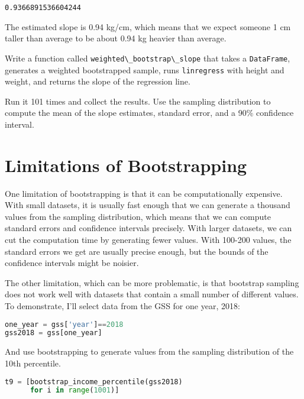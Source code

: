 \begin{lstlisting}[style=output]
0.9366891536604244
\end{lstlisting}

The estimated slope is 0.94 kg/cm, which means that we expect someone 1
cm taller than average to be about 0.94 kg heavier than average.

Write a function called
\passthrough{\lstinline!weighted\_bootstrap\_slope!} that takes a
\passthrough{\lstinline!DataFrame!}, generates a weighted bootstrapped
sample, runs \passthrough{\lstinline!linregress!} with height and
weight, and returns the slope of the regression line.

Run it 101 times and collect the results. Use the sampling distribution
to compute the mean of the slope estimates, standard error, and a 90\%
confidence interval.

\section{Limitations of
Bootstrapping}\label{limitations-of-bootstrapping}

One limitation of bootstrapping is that it can be computationally
expensive. With small datasets, it is usually fast enough that we can
generate a thousand values from the sampling distribution, which means
that we can compute standard errors and confidence intervals precisely.
With larger datasets, we can cut the computation time by generating
fewer values. With 100-200 values, the standard errors we get are
usually precise enough, but the bounds of the confidence intervals might
be noisier.

The other limitation, which can be more problematic, is that bootstrap
sampling does not work well with datasets that contain a small number of
different values. To demonstrate, I'll select data from the GSS for one
year, 2018:

\begin{lstlisting}[language=Python,style=source]
one_year = gss['year']==2018
gss2018 = gss[one_year]
\end{lstlisting}

\pagebreak

And use bootstrapping to generate values from the sampling
distribution of the 10th percentile.

\begin{lstlisting}[language=Python,style=source]
t9 = [bootstrap_income_percentile(gss2018)
      for i in range(1001)]
\end{lstlisting}


